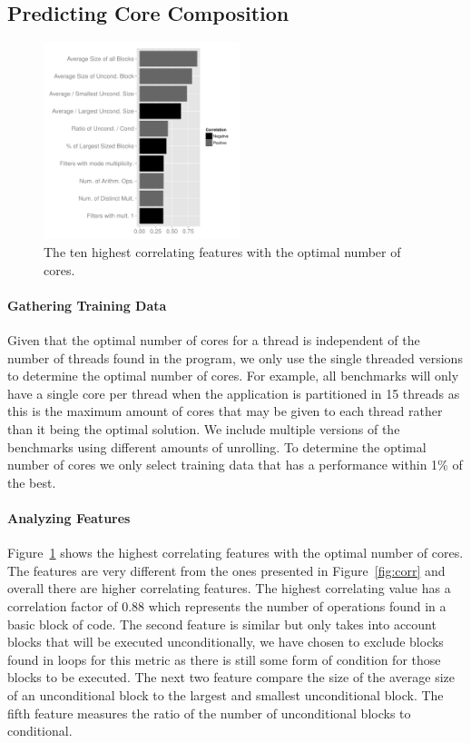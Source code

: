 \subsection{Predicting Core Composition}

\vspace{2mm}
\begin{figure}
  \includegraphics[width=0.51\textwidth]{graphics/coreCorr.pdf}
  \caption{The ten highest correlating features with the optimal number of cores.}\label{fig:corrCore}
  \vspace{4mm}
\end{figure}
\paragraph{Gathering Training Data}
Given that the optimal number of cores for a thread is independent of the number of threads found in the program, we only use the single threaded versions to determine the optimal number of cores.
For example, all benchmarks will only have a single core per thread when the application is partitioned in 15 threads as this is the maximum amount of cores that may be given to each thread rather than it being the optimal solution. 
We include multiple versions of the benchmarks using different amounts of unrolling.
To determine the optimal number of cores we only select training data that has a performance within 1\% of the best. 
  \vspace{2mm}

\paragraph{Analyzing Features}

Figure~\ref{fig:corrCore} shows the highest correlating features with the optimal number of cores.
The features are very different from the ones presented in Figure~\ref{fig:corr} and overall there are higher correlating features.
The highest correlating value has a correlation factor of 0.88 which represents the number of operations found in a basic block of code.
The second feature is similar but only takes into account blocks that will be executed unconditionally, we have chosen to exclude blocks found in loops for this metric as there is still some form of condition for those blocks to be executed.
The next two feature compare the size of the average size of an unconditional block to the largest and smallest unconditional block.
The fifth feature measures the ratio of the number of unconditional blocks to conditional.

